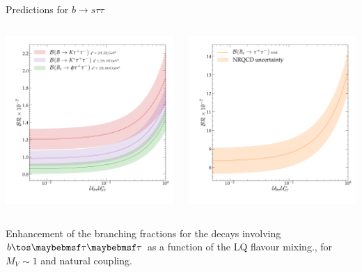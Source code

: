 \documentclass[9pt,usenames,dvipsnames]{beamer}
\begin{document}
\begin{frame}{Predictions for $ b \to s \tau \tau$ }
		\begin{columns}[c]
	\begin{center}
		\includegraphics[width=\textwidth]{./assets/bstautau} 
	\end{center}
			\begin{center}
				\includegraphics[width= \textwidth]{./assets/Bs_tautau} 
			\end{center}
		\end{columns}	

{\small Enhancement of the branching fractions for the decays involving~$b \tos \tau \tau$ as a function of the LQ flavour mixing., for $M_V \sim 1$ \TeV\xspace and natural coupling. }
\end{frame}
\end{document}
